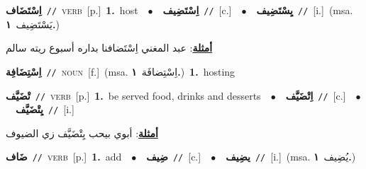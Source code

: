 \documentclass[10pt,a4paper,twoside]{article} %
\begin{document}
\begin{multicols}{2}
{\setlength\topsep{0pt}\textbf{\foreignlanguage{arabic}{اِسْتَضَاف}}\ {\color{gray}\texttt{//}\color{black}}\ \textsc{verb}\ [p.]\ \textbf{1.}~host\ \ $\bullet$\ \ \setlength\topsep{0pt}\textbf{\foreignlanguage{arabic}{اِسْتَضِيف}}\ {\color{gray}\texttt{//}\color{black}}\ [c.]\ \ $\bullet$\ \ \setlength\topsep{0pt}\textbf{\foreignlanguage{arabic}{يِسْتَضِيف}}\ {\color{gray}\texttt{//}\color{black}}\ [i.]\ \color{gray}(msa. \foreignlanguage{arabic}{يَسْتَضِيف}~\foreignlanguage{arabic}{\textbf{١.}})\color{black}\  \begin{flushright}\color{gray}\foreignlanguage{arabic}{\textbf{\underline{\foreignlanguage{arabic}{أمثلة}}}: عبد المغني اِسْتَضافنا بداره أسبوع ريته سالم}\end{flushright}\color{black}} \vspace{2mm}

{\setlength\topsep{0pt}\textbf{\foreignlanguage{arabic}{اِسْتِضَافِة}}\ {\color{gray}\texttt{//}\color{black}}\ \textsc{noun}\ [f.]\ \color{gray}(msa. \foreignlanguage{arabic}{اِسْتِضافَة}~\foreignlanguage{arabic}{\textbf{١.}})\color{black}\ \textbf{1.}~hosting\ } \vspace{2mm}

{\setlength\topsep{0pt}\textbf{\foreignlanguage{arabic}{تْضَيَّف}}\ {\color{gray}\texttt{//}\color{black}}\ \textsc{verb}\ [p.]\ \textbf{1.}~be served food, drinks and desserts\ \ $\bullet$\ \ \setlength\topsep{0pt}\textbf{\foreignlanguage{arabic}{اِتْضَيَّف}}\ {\color{gray}\texttt{//}\color{black}}\ [c.]\ \ $\bullet$\ \ \setlength\topsep{0pt}\textbf{\foreignlanguage{arabic}{يِتْضَيَّف}}\ {\color{gray}\texttt{//}\color{black}}\ [i.]\  \begin{flushright}\color{gray}\foreignlanguage{arabic}{\textbf{\underline{\foreignlanguage{arabic}{أمثلة}}}: أبوي بيحب يِتْضَيَّف زي الضيوف}\end{flushright}\color{black}} \vspace{2mm}

{\setlength\topsep{0pt}\textbf{\foreignlanguage{arabic}{ضَاف}}\ {\color{gray}\texttt{//}\color{black}}\ \textsc{verb}\ [p.]\ \textbf{1.}~add\ \ $\bullet$\ \ \setlength\topsep{0pt}\textbf{\foreignlanguage{arabic}{ضِيف}}\ {\color{gray}\texttt{//}\color{black}}\ [c.]\ \ $\bullet$\ \ \setlength\topsep{0pt}\textbf{\foreignlanguage{arabic}{يضِيف}}\ {\color{gray}\texttt{//}\color{black}}\ [i.]\ \color{gray}(msa. \foreignlanguage{arabic}{يُضِيف}~\foreignlanguage{arabic}{\textbf{١.}})\color{black}\ } \vspace{2mm}


\end{multicols}
\end{document}
